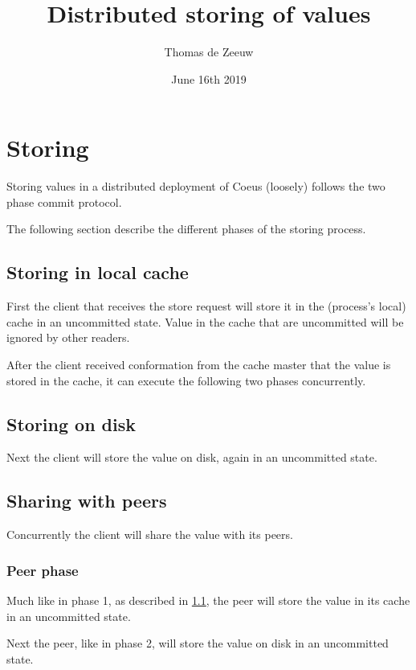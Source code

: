 \documentclass{scrartcl}
\title{Distributed storing of values}
\author{Thomas de Zeeuw}
\date{June 16th 2019}
\begin{document}
\maketitle

\section{Storing} \label{sec:storing}

Storing values in a distributed deployment of Coeus (loosely) follows the two
phase commit protocol.

The following section describe the different phases of the storing process.


\subsection{Storing in local cache} \label{sec:storing_phase1}

First the client that receives the store request will store it in the (process's
local) cache in an uncommitted state. Value in the cache that are uncommitted
will be ignored by other readers.

After the client received conformation from the cache master that the value is
stored in the cache, it can execute the following two phases concurrently.


\subsection{Storing on disk} \label{sec:storing_phase2}

Next the client will store the value on disk, again in an uncommitted state.


\subsection{Sharing with peers} \label{sec:storing_phase3}

Concurrently the client will share the value with its peers.

\subsubsection{Peer phase} \label{sec:storing_phase3_peer}

Much like in phase 1, as described in \ref{sec:storing_phase1}, the peer will
store the value in its cache in an uncommitted state.

Next the peer, like in phase 2, will store the value on disk in an uncommitted
state.
\end{document}
